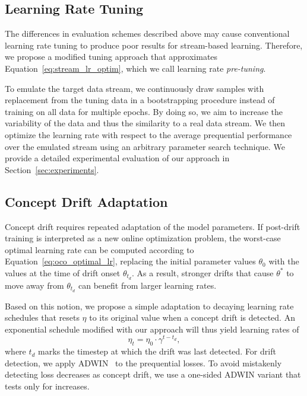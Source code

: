 \documentclass[runningheads]{llncs}
\begin{document}
\subsection{Learning Rate Tuning}\label{subsec:pre-tuning}

The differences in evaluation schemes described above may cause conventional learning rate tuning to produce poor results for stream-based learning.
Therefore, we propose a modified tuning approach that approximates Equation~\eqref{eq:stream_lr_optim}, which we call learning rate \textit{pre-tuning}.

To emulate the target data stream, we continuously draw samples with replacement from the tuning data in a bootstrapping procedure instead of training on all data for multiple epochs.
By doing so, we aim to increase the variability of the data and thus the similarity to a real data stream.
We then optimize the learning rate with respect to the average prequential performance over the emulated stream using an arbitrary parameter search technique.
We provide a detailed experimental evaluation of our approach in Section~\ref{sec:experiments}.

\subsection{Concept Drift Adaptation}

Concept drift requires repeated adaptation of the model parameters.
If post-drift training is interpreted as a new online optimization problem, the worst-case optimal learning rate can be computed according to Equation~\eqref{eq:oco_optimal_lr}, replacing the initial parameter values $\theta_0$ with the values at the time of drift onset $\theta_{t_d}$.
As a result, stronger drifts that cause $\theta^*$ to move away from $\theta_{t_d}$ can benefit from larger learning rates.

Based on this notion, we propose a simple adaptation to decaying learning rate schedules that resets $\eta$ to its original value when a concept drift is detected.
An exponential schedule modified with our approach will thus yield learning rates of
\begin{equation}
	\eta_t = \eta_0 \cdot \gamma^{t-t_d},
\end{equation}\label{eq:drift_reset}
where $t_d$ marks the timestep at which the drift was last detected.
For drift detection, we apply ADWIN~\cite{bifetLearningTimeChangingData2007} to the prequential losses.
To avoid mistakenly detecting loss decreases as concept drift, we use a one-sided ADWIN variant that tests only for increases.
\end{document}
